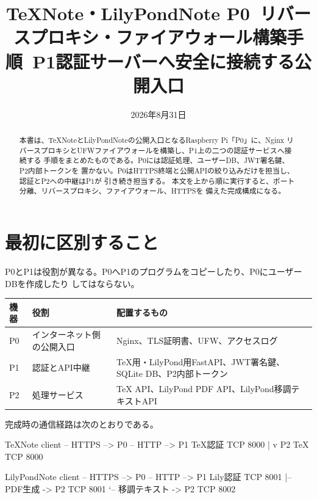 \documentclass[uplatex,a4paper,11pt]{jsarticle}
\title{TeXNote・LilyPondNote P0\
リバースプロキシ・ファイアウォール構築手順\
\large P1認証サーバーへ安全に接続する公開入口}
\author{}
\date{2026年8月31日}
\begin{document}
\maketitle

\begin{abstract}
本書は、TeXNoteとLilyPondNoteの公開入口となるRaspberry Pi「P0」に、Nginx
リバースプロキシとUFWファイアウォールを構築し、P1上の二つの認証サービスへ接続する
手順をまとめたものである。P0には認証処理、ユーザーDB、JWT署名鍵、P2内部トークンを
置かない。P0はHTTPS終端と公開APIの絞り込みだけを担当し、認証とP2への中継はP1が
引き続き担当する。
本文を上から順に実行すると、ポート分離、リバースプロキシ、ファイアウォール、HTTPSを
備えた完成構成になる。
\end{abstract}

\tableofcontents
\newpage

\section{最初に区別すること}

P0とP1は役割が異なる。P0へP1のプログラムをコピーしたり、P0にユーザーDBを作成したり
してはならない。

\begin{longtable}{@{}p{18mm}p{51mm}p{77mm}@{}}
\toprule
機器 & 役割 & 配置するもの\\
\midrule
P0 & インターネット側の公開入口 & Nginx、TLS証明書、UFW、アクセスログ\\
P1 & 認証とAPI中継 & TeX用・LilyPond用FastAPI、JWT署名鍵、SQLite DB、P2内部トークン\\
P2 & 処理サービス & TeX API、LilyPond PDF API、LilyPond移調テキストAPI\\
\bottomrule
\end{longtable}

完成時の通信経路は次のとおりである。

\begin{command}
TeXNote client       -- HTTPS --> P0 -- HTTP --> P1 TeX認証 TCP 8000
                                                   |
                                                   v
                                                P2 TeX TCP 8000

LilyPondNote client  -- HTTPS --> P0 -- HTTP --> P1 Lily認証 TCP 8001
                                                   |-- PDF生成 -> P2 TCP 8001
                                                   `-- 移調テキスト -> P2 TCP 8002
\end{command}
\end{document}
